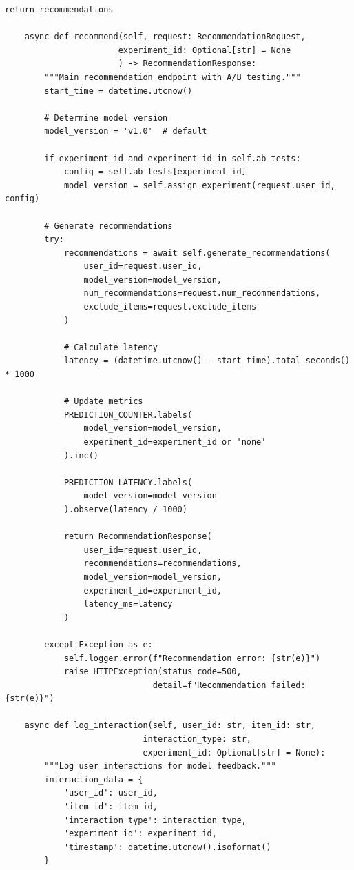\begin{lstlisting}[style=python, caption=FastAPI Serving with A/B Testing]
        return recommendations

    async def recommend(self, request: RecommendationRequest,
                       experiment_id: Optional[str] = None
                       ) -> RecommendationResponse:
        """Main recommendation endpoint with A/B testing."""
        start_time = datetime.utcnow()

        # Determine model version
        model_version = 'v1.0'  # default

        if experiment_id and experiment_id in self.ab_tests:
            config = self.ab_tests[experiment_id]
            model_version = self.assign_experiment(request.user_id, config)

        # Generate recommendations
        try:
            recommendations = await self.generate_recommendations(
                user_id=request.user_id,
                model_version=model_version,
                num_recommendations=request.num_recommendations,
                exclude_items=request.exclude_items
            )

            # Calculate latency
            latency = (datetime.utcnow() - start_time).total_seconds() * 1000

            # Update metrics
            PREDICTION_COUNTER.labels(
                model_version=model_version,
                experiment_id=experiment_id or 'none'
            ).inc()

            PREDICTION_LATENCY.labels(
                model_version=model_version
            ).observe(latency / 1000)

            return RecommendationResponse(
                user_id=request.user_id,
                recommendations=recommendations,
                model_version=model_version,
                experiment_id=experiment_id,
                latency_ms=latency
            )

        except Exception as e:
            self.logger.error(f"Recommendation error: {str(e)}")
            raise HTTPException(status_code=500,
                              detail=f"Recommendation failed: {str(e)}")

    async def log_interaction(self, user_id: str, item_id: str,
                            interaction_type: str,
                            experiment_id: Optional[str] = None):
        """Log user interactions for model feedback."""
        interaction_data = {
            'user_id': user_id,
            'item_id': item_id,
            'interaction_type': interaction_type,
            'experiment_id': experiment_id,
            'timestamp': datetime.utcnow().isoformat()
        }


\end{lstlisting}
